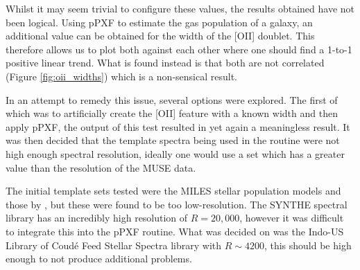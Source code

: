 \documentclass[12pt, twocolumn]{revtex4-1}    %
\begin{document}


Whilst it may seem trivial to configure these values, the results obtained have not been logical. Using pPXF to estimate the gas population of a galaxy, an additional value can be obtained for the width of the [OII] doublet. This therefore allows us to plot both against each other where one should find a 1-to-1 positive linear trend. What is found instead is that both are not correlated (Figure \ref{fig:oii_widths}) which is a non-sensical result. 

In an attempt to remedy this issue, several options were explored. The first of which was to artificially create the [OII] feature with a known width and then apply pPXF, the output of this test resulted in yet again a meaningless result. It was then decided that the template spectra being used in the routine were not high enough spectral resolution, ideally one would use a set which has a greater value than the resolution of the MUSE data. 


The initial template sets tested were the MILES stellar population models \citep{vazdekis_miles} and those by \cite{jacoby_spectra}, but these were found to be too low-resolution. The SYNTHE spectral library \citep{munari_synthe} has an incredibly high resolution of $R=20,000$, however it was difficult to integrate this into the pPXF routine. What was decided on was the Indo-US Library of Coud{\'e} Feed Stellar Spectra \citep{valdes_coude} library with $R\sim4200$, this should be high enough to not produce additional problems.
\end{document}
